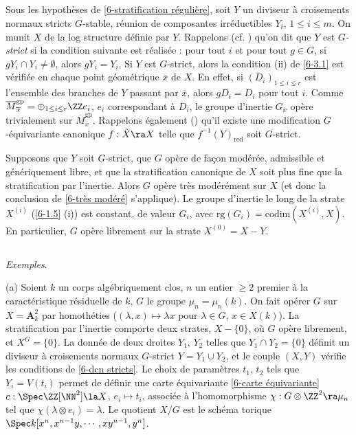 \documentclass[10pt]{../fichiers-configuration-latex/smfart}
\begin{document}
\subsection{}\label{6-dcn stables} Sous les hypothèses de \ref{6-stratification régulière}, soit $Y$
un diviseur à croisements normaux stricts $G$-stable, réunion de composantes irréductibles $Y_i$,
$1\le i \le m$. On munit $X$ de la log structure définie par $Y$. Rappelons (cf.
\cite[7.1]{Alterations@de_Jong}) qu'on dit que $Y$ est \textit{$G$-strict} si la condition suivante
est réalisée :  pour tout $i$ et pour tout $g \in G$, si $gY_i \cap Y_i \ne \emptyset$, alors $gY_i
= Y_i$. Si $Y$ est $G$-strict, alors la condition (ii) de \ref{6-3.1} est vérifiée en chaque point
géométrique $\overline{x}$ de $X$. En effet, si $(D_i)_{1 \le i \le r}$ est l'ensemble des branches
de $Y$ passant par $\overline{x}$, alors $gD_i = D_i$ pour tout $i$. Comme
$\overline{M}^{\mathrm{gp}}_{\overline{x}} = \oplus_{1 \le i \le r}\ZZ e_i$, $e_i$ correspondant à
$D_i$, le groupe d'inertie $G_{\overline{x}}$ opère trivialement sur
$\overline{M}^{\mathrm{gp}}_{\overline{x}}$. Rappelons également (\cite[7.2]{Alterations@de_Jong})
qu'il existe une modification $G$-équivariante canonique $f : \tilde X \ra X$ telle que
$f^{-1}(Y)_{\mathrm{red}}$ soit $G$-strict.

\begin{corollaire}\label{6-dcn stricts} Supposons que $Y$ soit $G$-strict, que $G$ opère de façon
modérée, admissible et génériquement libre, et que la stratification canonique de $X$ soit plus fine
que la stratification par l'inertie. Alors $G$ opère très modérément sur $X$ (et donc la conclusion
de \ref{6-très modéré} s'applique). Le groupe d'inertie le long de la strate $X^{(i)}$ (\ref{6-1.5}
(i)) est constant, de valeur $G_i$, avec $\mathrm{rg}(G_i) = \mathrm{codim}(X^{(i)},X)$. En
particulier, $G$ opère librement sur la strate $X^{(0)} = X-Y$.  \end{corollaire}
\subsection{}\label{6-exemples}\textit{Exemples}. 

(a) Soient $k$ un corps algébriquement clos, $n$ un entier $\ge 2$ premier à la caractéristique
résiduelle de $k$, $G$ le groupe $\mu_n = \mu_n(k)$. On fait opérer $G$ sur $X = \mathbf{A}^2_k$ par
homothéties ($(\lambda,x) \mapsto \lambda x$ pour $\lambda \in G$, $x \in X(k)$). La stratification
par l'inertie comporte deux strates, $X-\{0\}$, où $G$ opère librement, et $X^G = \{0\}$. La donnée
de deux droites $Y_1$, $Y_2$ telles que $Y_1 \cap Y_2 = \{0\}$ définit un diviseur à croisements
normaux $G$-strict $Y = Y_1 \cup Y_2$, et le couple $(X,Y)$ vérifie les conditions de \ref{6-dcn
stricts}. Le choix de paramètres $t_1$, $t_2$ tels que $Y_i = V(t_i)$ permet de définir une carte
équivariante \ref{6-carte équivariante} $c : \Spec \ZZ[\NN^2] \la X$, $e_i \mapsto t_i$, associée à
l'homomorphisme $\chi : G \otimes \ZZ^2 \ra \mu_n$ tel que $\chi(\lambda \otimes e_i) = \lambda$. Le
quotient $X/G$ est le schéma torique $\Spec k[x^n,x^{n-1}y, \cdots, xy^{n-1}, y^n]$.
\end{document}
